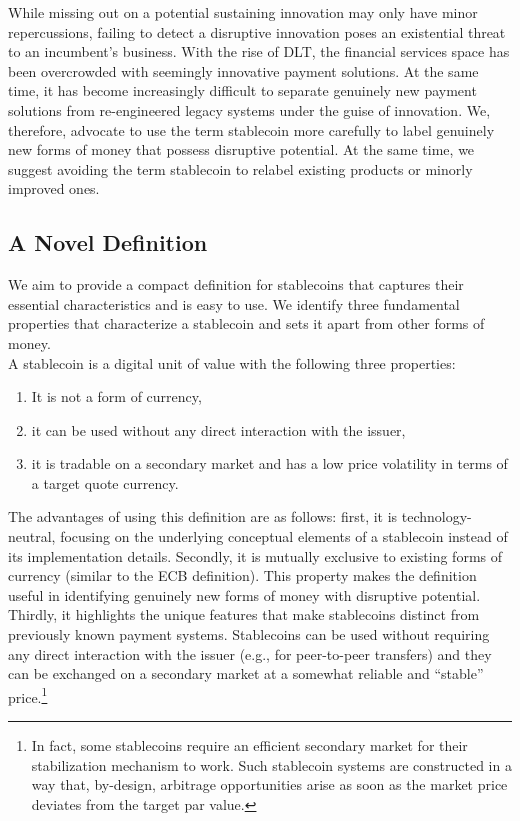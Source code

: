 \documentclass[conference]{IEEEtran}
\begin{document}
While missing out on a potential sustaining innovation may only have minor repercussions, failing to detect a disruptive innovation poses an existential threat to an incumbent's business. With the rise of \ac{DLT}, the financial services space has been overcrowded with seemingly innovative payment solutions. At the same time, it has become increasingly difficult to separate genuinely new payment solutions from re-engineered legacy systems under the guise of innovation. We, therefore, advocate to use the term stablecoin more carefully to label genuinely new forms of money that possess disruptive potential. At the same time, we suggest avoiding the term stablecoin to relabel existing products or minorly improved ones.

\subsection{A Novel Definition}
\label{sec:definition}
We aim to provide a compact definition for stablecoins that captures their essential characteristics and is easy to use. We identify three fundamental properties that characterize a stablecoin and sets it apart from other forms of money.\\

A stablecoin is a digital unit of value with the following three properties:
\begin{enumerate}
	\item It is not a form of currency, 
	\item it can be used without any direct interaction with the issuer,
	\item it is tradable on a secondary market and has a low price volatility in terms of a target quote currency.
\end{enumerate}

The advantages of using this definition are as follows: first, it is technology-neutral, focusing on the underlying conceptual elements of a stablecoin instead of its implementation details. Secondly, it is mutually exclusive to existing forms of currency (similar to the \ac{ECB} definition). This property makes the definition useful in identifying genuinely new forms of money with disruptive potential. Thirdly, it highlights the unique features that make stablecoins distinct from previously known payment systems. Stablecoins can be used without requiring any direct interaction with the issuer (e.g., for peer-to-peer transfers) and they can be exchanged on a secondary market at a somewhat reliable and ``stable'' price.\footnote{In fact, some stablecoins require an efficient secondary market for their stabilization mechanism to work. Such stablecoin systems are constructed in a way that, by-design, arbitrage opportunities arise as soon as the market price deviates from the target par value.}
\end{document}
